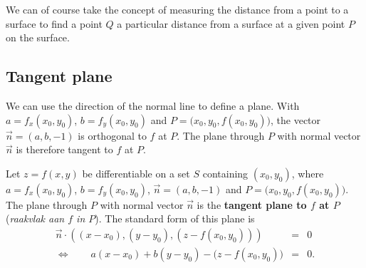We can of course take the concept of measuring the distance from a point to a surface to find a point $Q$ a particular distance from a surface at a given point $P$ on the surface.

\subsection{Tangent plane}
We can use the direction of the normal line to define a plane. With $a=f_x(x_0,y_0)$, $b=f_y(x_0,y_0)$ and $P = \big(x_0,y_0,f(x_0,y_0)\big)$, the vector $\vec n=\left( a,b,-1\right)$ is orthogonal to $f$ at $P$. The plane through $P$ with normal vector $\vec n$ is therefore tangent to $f$ at $P$.
	\checkoddpage
{}


\begin{definition}\label{def:tangent_plane}
Let $z=f(x,y)$ be differentiable on a set $S$ containing $(x_0,y_0)$, where
$a = f_x(x_0,y_0)$, $b=f_y(x_0,y_0)$, $\vec n= \left( a,b,-1\right)$ and $P=\big(x_0,y_0,f(x_0,y_0)\big)$.\\

The plane through $P$ with normal vector $\vec n$ is the \textbf{tangent plane to $f$ at $P$} (\textit{raakvlak aan $f$ in $P$}). The standard form of this plane is 
\begin{eqnarray*}
\vec{n}\cdot\left((x-x_0),(y-y_0),(z-f(x_0,y_0))\right)&=&0\\
\Leftrightarrow\qquad a(x-x_0) + b(y-y_0) - \big(z-f(x_0,y_0)\big)&=&0.
\end{eqnarray*}
\end{definition}



